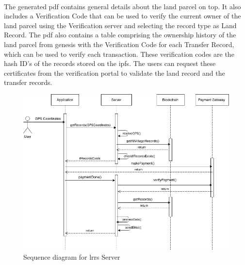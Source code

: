 \documentclass[12pt]{article}
\begin{document}
        \paragraph{}
        The generated \acrshort{pdf} contains general details about the land parcel on top. It also includes a Verification Code that can be used to verify the current owner of the land parcel using the Verification server and selecting the record type as Land Record. The \acrshort{pdf} also contains a table comprising the ownership history of the land parcel from genesis with the Verification Code for each Transfer Record, which can be used to verify each transaction. These verification codes are the hash ID's of the records stored on the \acrshort{ipfs}. The users can request these certificates from the verification portal to validate the land record and the transfer records.
        \begin{figure}[H]
                \includegraphics[scale=0.5]{lrsp_seq.png}
                \centering
                \caption{Sequence diagram for \acrshort{lrrs} Server}
        \end{figure}
\end{document}
